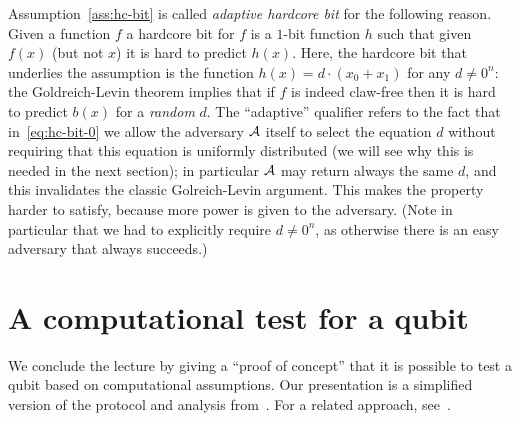 \begin{remark}
Assumption~\ref{ass:hc-bit} is called \emph{adaptive hardcore bit} for the following reason. Given a function $f$ a hardcore bit for $f$ is a $1$-bit function $h$ such that given $f(x)$ (but not $x$) it is hard to predict $h(x)$. Here, the hardcore bit that underlies the assumption is the function $h(x)=d\cdot (x_0+x_1)$ for any $d\neq 0^n$: the Goldreich-Levin theorem implies that if $f$ is indeed claw-free then it is hard to predict $b(x)$ for a \emph{random} $d$. The ``adaptive'' qualifier refers to the fact that in~\eqref{eq:hc-bit-0} we allow the adversary $\mathcal{A}$ itself to select the equation $d$ without requiring that this equation is uniformly distributed  (we will see why this is needed in the next section); in particular $\mathcal{A}$ may return always the same $d$, and this invalidates the classic Golreich-Levin argument. This makes the property harder to satisfy, because more power is given to the adversary. (Note in particular that we had to explicitly require $d\neq 0^n$, as otherwise there is an easy adversary that always succeeds.)
\end{remark}

\section{A computational test for a qubit}

We conclude the lecture by giving a ``proof of concept'' that it is possible to test a qubit based on computational assumptions. Our presentation is a simplified version of the protocol and analysis from~\cite{brakerski2018cryptographic}. For a related approach, see~\cite{cojocaru2019qfactory}. 

